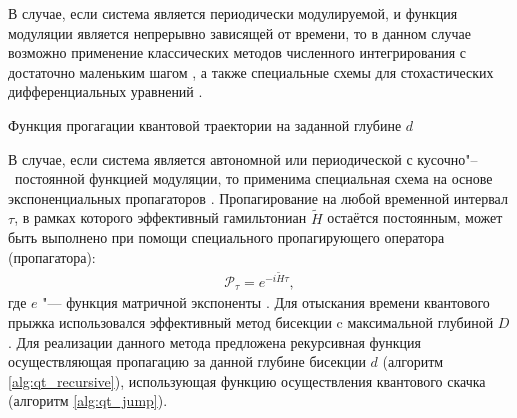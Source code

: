 В случае, если система является периодически модулируемой, и функция модуляции является непрерывно зависящей от времени, то в данном случае возможно применение классических методов численного интегрирования \cite{Lambert1991} с достаточно маленьким шагом \cite{Breuer2007}, а также специальные схемы для стохастических дифференциальных уравнений \cite{Cao2003}.

\IncMargin{1em}
\begin{algorithm}
	\SetAlgoLined
	\caption{Функция прогагации квантовой траектории на заданной глубине \(d\)}
	\label{alg:qt_recursive}
\end{algorithm}
\DecMargin{1em}

В случае, если система является автономной или периодической с кусочно"--~постоянной функцией модуляции, то применима специальная схема на основе экспоненциальных пропагаторов \cite{Volokitin2017}.
Пропагирование на любой временной интервал \(\tau\), в рамках которого эффективный гамильтониан \(\tilde{H}\) остаётся постоянным, может быть выполнено при помощи специального пропагирующего оператора (пропагатора):
\begin{equation}
\label{eq:propagator}
\begin{gathered}
\mathcal{P}_{\tau} = e^{-i \tilde{H} \tau},
\end{gathered}
\end{equation}
где \(e\) "--- функция матричной экспоненты \cite{Moler2003}. Для отыскания времени квантового прыжка использовался эффективный метод бисекции \cite{Knuth1997} c максимальной глубиной \(D\). 
Для реализации данного метода предложена рекурсивная функция осуществляющая пропагацию за данной глубине бисекции \(d\) (алгоритм \ref{alg:qt_recursive}), использующая функцию осуществления квантового скачка (алгоритм \ref{alg:qt_jump}).

